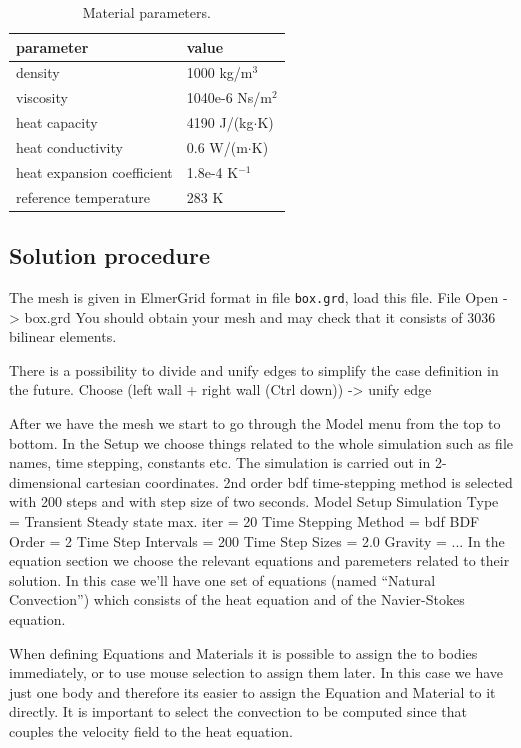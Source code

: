 \begin{table}[h]
\caption{Material parameters.}
\label{tb:matpar}
\begin{center}
\begin{tabular}{ll} \hline
parameter  & value \\ \hline
density & 1000 kg/m$^{3}$ \\
viscosity & 1040e-6 Ns/m$^{2}$ \\
heat capacity & 4190 J/(kg$\cdot$K) \\
heat conductivity & 0.6 W/(m$\cdot$K)       \\
heat expansion coefficient & 1.8e-4 K$^{-1}$      \\ 
reference temperature & 283 K       \\ \hline
\end{tabular}
\end{center}
\end{table}


\subsection*{Solution procedure}

The mesh is given in ElmerGrid format in file \texttt{box.grd}, load this file.
\ttbegin
File 
  Open -> box.grd
\ttend
You should obtain your mesh and may check that it consists of 3036 bilinear elements.

There is a possibility to divide and unify edges to simplify the case definition in the future.
\ttbegin
Choose (left wall + right wall (Ctrl down)) -> unify edge
\ttend

After we have the mesh we start to go through the Model menu from the top to bottom. 
In the Setup we choose things related to the whole simulation such as file names, 
time stepping, constants etc.
The simulation is carried out in 2-dimensional cartesian
coordinates. 2nd order bdf time-stepping method is selected with 200 steps
and with step size of two seconds.
\ttbegin
Model
  Setup 
    Simulation Type = Transient
    Steady state max. iter = 20
    Time Stepping Method = bdf
    BDF Order = 2
    Time Step Intervals = 200
    Time Step Sizes = 2.0
    Gravity = ...
\ttend
In the equation section we choose the relevant equations and paremeters related to their solution. 
In this case we'll have one set of equations (named ``Natural Convection'') which consists of the heat equation
and of the Navier-Stokes equation.

When defining Equations and Materials it is possible to assign the to bodies immediately, or to use mouse
selection to assign them later. In this case we have just one body and therefore its easier to assign 
the Equation and Material to it directly.
It is important to select the 
convection to be computed since that couples the velocity field to the heat equation.

